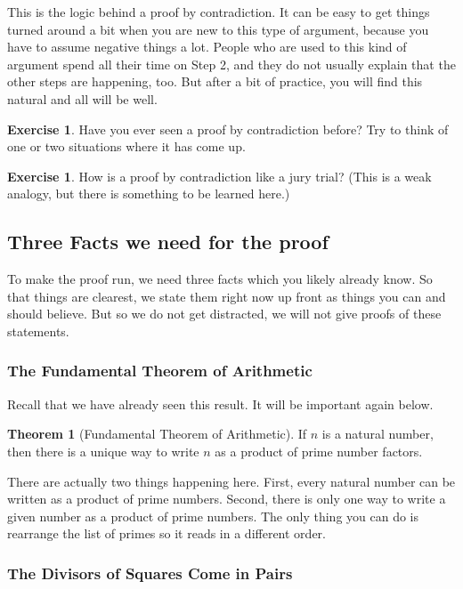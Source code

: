 \documentclass[12pt,letterpaper]{article}
\theoremstyle{definition}
\newtheorem{exercise}[question]{Exercise}
\newtheorem{theorem}{Theorem}
\begin{document}
This is the logic behind a proof by contradiction.
It can be easy to get things turned around a bit when you are new to this type of argument, because you have to assume negative things a lot.
People who are used to this kind of argument spend all their time on Step 2, and they do not usually explain that the other steps are happening, too.
But after a bit of practice, you will find this natural and all will be well.

\begin{exercise}
Have you ever seen a proof by contradiction before?
Try to think of one or two situations where it has come up.
\end{exercise}

\begin{exercise}
How is a proof by contradiction like a jury trial?
(This is a weak analogy, but there is something to be learned here.)
\end{exercise}

\subsection*{Three Facts we need for the proof}
To make the proof run, we need three facts which you likely already know.
So that things are clearest, we state them right now up front as things you can and should believe.
But so we do not get distracted, we will not give proofs of these statements.

\subsubsection*{The Fundamental Theorem of Arithmetic}
Recall that we have already seen this result.
It will be important again below.
\begin{theorem}[Fundamental Theorem of Arithmetic]
\label{fta}
If $n$ is a natural number, then there is a unique way to write $n$ as a product of prime number factors.
\end{theorem}

There are actually two things happening here.
First, every natural number can be written as a product of prime numbers.
Second, there is only one way to write a given number as a product of prime numbers.
The only thing you can do is rearrange the list of primes so it reads in a different order.

\subsubsection*{The Divisors of Squares Come in Pairs}
\end{document}
